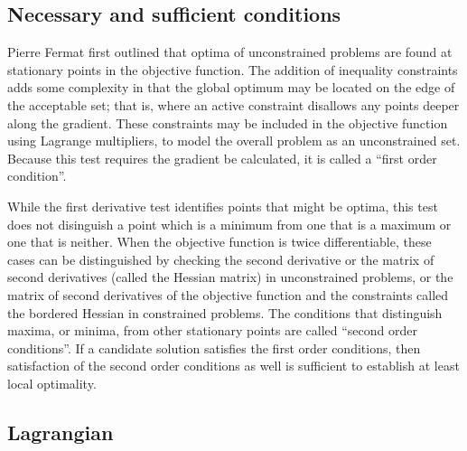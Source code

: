 
\subsection{Necessary and sufficient conditions}

Pierre Fermat first outlined that optima of unconstrained problems are found at stationary points in the objective function. The addition of inequality constraints adds some complexity in that the global optimum may be located on the edge of the acceptable set; that is, where an active constraint disallows any points deeper along the gradient. These constraints may be included in the objective function using Lagrange multipliers, to model the overall problem as an unconstrained set. Because this test requires the gradient be calculated, it is called a \enquote{first order condition}.

While the first derivative test identifies points that might be optima, this test does not disinguish a point which is a minimum from one that is a maximum or one that is neither. When the objective function is twice differentiable, these cases can be distinguished by checking the second derivative or the matrix of second derivatives (called the Hessian matrix) in unconstrained problems, or the matrix of second derivatives of the objective function and the constraints called the bordered Hessian in constrained problems. The conditions that distinguish maxima, or minima, from other stationary points are called \enquote{second order conditions}. If a candidate solution satisfies the first order conditions, then satisfaction of the second order conditions as well is sufficient to establish at least local optimality.


\subsection{Lagrangian} \label{sub:Lagrangian}

